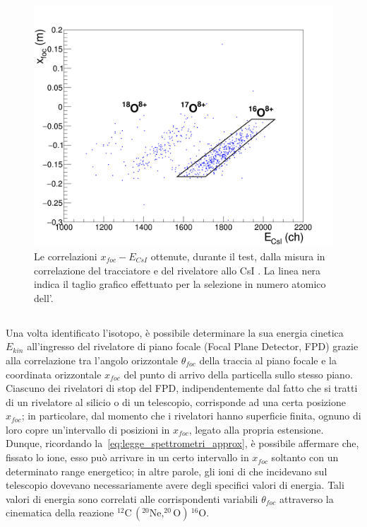 \begin{figure} [!p]
	\centering
	\includegraphics[width=\textwidth, keepaspectratio]{Grafici_Tesi/Test/matrice_xfoc2_csi_taglio.png}
	\caption{Le correlazioni $x_{foc} - E_{CsI}$ ottenute, durante il test, dalla misura in correlazione del tracciatore e del rivelatore allo CsI . La linea nera indica il taglio grafico effettuato per la selezione in numero atomico dell'.} \label{fig:xfoc2_csi_standard}
\end{figure}



\subsection{}

Una volta identificato l'isotopo, è possibile determinare la sua energia cinetica $E_{kin}$ all'ingresso del rivelatore di piano focale (Focal Plane Detector, FPD) grazie alla correlazione tra l'angolo orizzontale $\theta_{foc}$ della traccia al piano focale e la coordinata orizzontale $x_{foc}$ del punto di arrivo della particella sullo stesso piano.
Ciascuno dei rivelatori di stop del FPD, indipendentemente dal fatto che si tratti di un rivelatore al silicio o di un telescopio, corrisponde ad una certa posizione $x_{foc}$; in particolare, dal momento che i rivelatori hanno superficie finita, ognuno di loro copre un'intervallo di posizioni in $x_{foc}$, legato alla propria estensione.
Dunque, ricordando la~\ref{eq:legge_spettrometri_approx}, è possibile affermare che, fissato lo ione, esso può arrivare in un certo intervallo in $x_{foc}$ soltanto con un determinato range energetico; in altre parole, gli ioni di  che incidevano sul telescopio dovevano necessariamente avere degli specifici valori di energia.
Tali valori di energia sono correlati alle corrispondenti variabili $\theta_{foc}$ attraverso la cinematica della reazione $^{12}\mbox{C}\,  ( ^{20}\mbox{Ne}, ^{20}\mbox{O} ) \, ^{16}\mbox{O} $.

